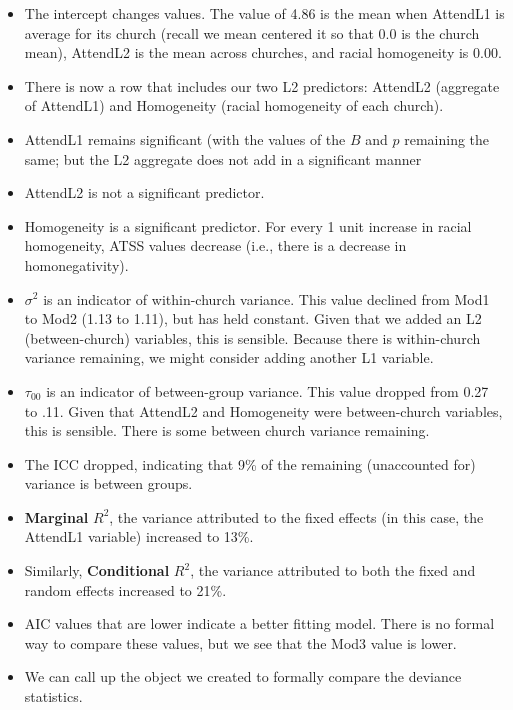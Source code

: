 \documentclass[
  11pt,
]{book}
\providecommand{\tightlist}{%
  \setlength{\itemsep}{0pt}\setlength{\parskip}{0pt}}
\begin{document}
\begin{itemize}
\tightlist
\item
  The intercept changes values. The value of 4.86 is the mean when AttendL1 is average for its church (recall we mean centered it so that 0.0 is the church mean), AttendL2 is the mean across churches, and racial homogeneity is 0.00.\\
\item
  There is now a row that includes our two L2 predictors: AttendL2 (aggregate of AttendL1) and Homogeneity (racial homogeneity of each church).
\item
  AttendL1 remains significant (with the values of the \(B\) and \(p\) remaining the same; but the L2 aggregate does not add in a significant manner
\item
  AttendL2 is not a significant predictor.
\item
  Homogeneity is a significant predictor. For every 1 unit increase in racial homogeneity, ATSS values decrease (i.e., there is a decrease in homonegativity).
\item
  \(\sigma^{2}\) is an indicator of within-church variance. This value declined from Mod1 to Mod2 (1.13 to 1.11), but has held constant. Given that we added an L2 (between-church) variables, this is sensible. Because there is within-church variance remaining, we might consider adding another L1 variable.
\item
  \(\tau _{00}\) is an indicator of between-group variance. This value dropped from 0.27 to .11. Given that AttendL2 and Homogeneity were between-church variables, this is sensible. There is some between church variance remaining.
\item
  The ICC dropped, indicating that 9\% of the remaining (unaccounted for) variance is between groups.
\item
  \textbf{Marginal} \(R^2\), the variance attributed to the fixed effects (in this case, the AttendL1 variable) increased to 13\%.
\item
  Similarly, \textbf{Conditional} \(R^2\), the variance attributed to both the fixed and random effects increased to 21\%.
\item
  AIC values that are lower indicate a better fitting model. There is no formal way to compare these values, but we see that the Mod3 value is lower.
\item
  We can call up the object we created to formally compare the deviance statistics.
\end{itemize}
\end{document}
